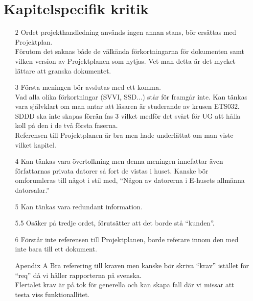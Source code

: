 \documentclass[a4paper]{article}
\begin{document}
\section{Kapitelspecifik kritik}
\begin{itemize}
\item[2] Ordet projekthandledning används ingen annan stans, bör ersättas med Projektplan.\\
Förutom det saknas både de välkända förkortningarna för dokumenten samt vilken version av Projektplanen som nytjas. Vet man detta är det mycket lättare att granska dokumentet.

\item[3] Första meningen bör avslutas med ett komma. \\
Vad alla olika förkortningar (SVVI, SSD...) står för framgår inte. Kan tänkas vara självklart om man antar att läsaren är studerande av krusen ETS032. \\
SDDD ska inte skapas förrän fas 3 vilket medför det svårt för UG att hålla koll på den i de två första faserna.\\
Referensen till Projektplanen är bra men hade underlättat om man viste vilket kapitel.

\item[4]
Kan tänkas vara övertolkning men denna meningen innefattar även författarnas privata datorer så fort de vistas i huset. Kanske bör omforumleras till något i stil med, ``Någon av datorerna i E-husets allmänna 
datorsalar.''

\item[5] Kan tänkas vara redundant information.

\item[5.5] Osäker på tredje ordet, förutsätter att det borde stå ``kunden''.

\item[6] Förstår inte referensen till Projektplanen, borde referare innom den med inte bara till ett dokument.

\item[Apendix A] 
Bra referering till kraven men kanske bör skriva ``krav'' istället för ``req'' då vi håller rapporterna på svenska.\\

Flertalet krav är på tok för generella och kan skapa fall där vi missar att testa viss funktionallitet.


\end{itemize}
\end{document}
